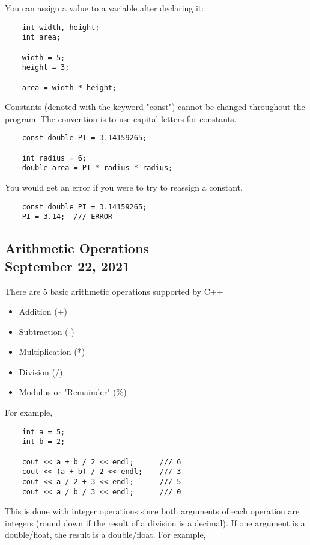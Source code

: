 \documentclass[]{article}
\begin{document}
You can assign a value to a variable after declaring it:
\begin{lstlisting}	
	int width, height;
	int area;
	
	width = 5;
	height = 3;
	
	area = width * height;
\end{lstlisting}
\bigbreak

Constants (denoted with the keyword "const") cannot be changed throughout the program. The convention is to use capital letters for constants.
\begin{lstlisting}	
	const double PI = 3.14159265;

	int radius = 6;
	double area = PI * radius * radius;
\end{lstlisting}
\bigbreak

You would get an error if you were to try to reassign a constant.
\begin{lstlisting}
	const double PI = 3.14159265;
	PI = 3.14; 	/// ERROR
\end{lstlisting}
\bigbreak

\subsection{Arithmetic Operations\\ {\large \normalfont September 22, 2021}}
\bigbreak

There are 5 basic arithmetic operations supported by C++
\begin{itemize}
	\item Addition (+)
	\item Subtraction (-)
	\item Multiplication (*)
	\item Division (/)
	\item Modulus or "Remainder" (\%)
\end{itemize}
\bigbreak

For example,

\begin{lstlisting}
	int a = 5;
	int b = 2;
	
	cout << a + b / 2 << endl;  	/// 6
	cout << (a + b) / 2 << endl;  	/// 3
	cout << a / 2 + 3 << endl;  	/// 5
	cout << a / b / 3 << endl;  	/// 0
\end{lstlisting}
\bigbreak

This is done with integer operations since both arguments of each operation are integers (round down if the result of a division is a decimal). If one argument is a double/float, the result is a double/float. For example,
\end{document}
